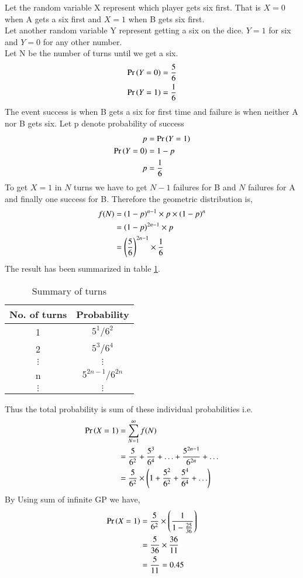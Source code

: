 
Let the random variable X represent which player gets six first. That is $X=0 $ when A gets a six first and $X=1 $ when B gets six first. \\
Let another random variable Y represent getting a six on the dice. $Y=1 $ for six and $Y=0 $ for any other number. \\
Let N be the number of turns until we get a six.
\begin{align}
    \Pr\left(Y=0\right) = \frac{5}{6} \\
    \Pr\left(Y=1\right) = \frac{1}{6}
\end{align}
The event success is when B gets a six for first time and failure is when neither A nor B gets six. Let p denote probability of success 
\begin{align}
    p &= \Pr\left(Y=1\right)  \\
    \Pr\left(Y=0\right) &= 1- p \\
    p &= \frac{1}{6}
\end{align}
To get $X=1 $ in $N$ turns we have to get $N-1$ failures for B and $ N$ failures for A and finally one success for B. 
Therefore the geometric distribution is,
\begin{align}
    f(N) &= \left(1-p\right)^{n-1} \times p \times  \left(1-p\right)^{n} \\
    &  = \left(1-p\right)^{2n-1} \times p \\
    & = \left( \frac{5}{6}\right)^{2n-1} \times \frac{1}{6}
\end{align}
The result has been summarized in table \ref{tab:table geometric distribution}. \\
\begin{table}[hbt!]
\centering
\begin{tabular}{|c|c|}
\hline
\textbf{No. of turns} & \textbf{Probability} \\ \hline
1                     & $5^1/6^2  $            \\ \hline
2                     & $5^3/6^4 $             \\ \hline
$\vdots  $              & $\vdots $              \\
n                     & $5^{2n-1}/6^{2n} $         \\ \hline
$\vdots $               & $\vdots $              \\ \hline
\end{tabular}
\caption{Summary of turns}
\label{tab:table geometric distribution}
\end{table}
Thus the total probability is sum of these individual probabilities i.e.
\begin{align}
    \Pr\left(X=1\right) &= \sum_{N=1}^{\infty} f(N) \\
    &= \frac{5}{6^2} + \frac{5^3}{6^4} + \hdots + \frac{5^{2n-1}}{6^{2n}} +\hdots  \\
    &= \frac{5}{6^2} \times \left(1 + \frac{5^2}{6^2} + \frac{5^4}{6^4} + \hdots \right) 
\end{align}
By Using sum of infinite GP we have, 
\begin{align}
     \Pr\left(X=1\right) &= \frac{5}{6^2} \times \left(\frac{1}{1 - \frac{25}{36}}\right)  \\
       &= \frac{5}{36} \times \frac{36}{11} \\
       &= \frac{5}{11} = 0.45
\end{align}